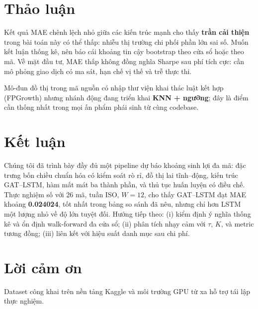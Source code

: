 \documentclass[12pt,a4paper]{article}
\begin{document}
\section{Thảo luận}

Kết quả MAE chênh lệch nhỏ giữa các kiến trúc mạnh cho thấy \textbf{trần cải thiện} trong bài toán này có thể thấp: nhiễu thị trường chi phối phần lớn sai số. Muốn kết luận thống kê, nên báo cái khoảng tin cậy bootstrap theo cửa sổ hoặc theo mã. Về mặt đầu tư, MAE thấp không đồng nghĩa Sharpe sau phí tích cực: cần mô phỏng giao dịch có ma sát, hạn chế vị thế và trễ thực thi.

Mô-đun đồ thị trong mã nguồn có nhập thư viện khai thác luật kết hợp (FPGrowth) nhưng nhánh động đang triển khai \textbf{KNN + ngưỡng}; đây là điểm cần thống nhất trong mọi ấn phẩm phái sinh từ cùng codebase.

\section{Kết luận}

Chúng tôi đã trình bày đầy đủ một pipeline dự báo khoảng sinh lợi đa mã: đặc trưng bốn chiều chuẩn hóa có kiểm soát rò rỉ, đồ thị lai tĩnh--động, kiến trúc GAT--LSTM, hàm mất mát ba thành phần, và thủ tục huấn luyện có điều chế. Thực nghiệm số với 26 mã, tuần ISO, $W=12$, cho thấy GAT--LSTM đạt MAE khoảng \textbf{0.024024}, tốt nhất trong bảng so sánh đã nêu, nhưng chỉ hơn LSTM một lượng nhỏ về độ lớn tuyệt đối. Hướng tiếp theo: (i) kiểm định ý nghĩa thống kê và ổn định walk-forward đa cửa sổ; (ii) phân tích nhạy cảm với $\tau$, $K$, và metric tương đồng; (iii) liên kết với hiệu suất danh mục sau chi phí.

\section*{Lời cảm ơn}
Dataset công khai trên nền tảng Kaggle và môi trường GPU từ xa hỗ trợ tái lập thực nghiệm.
\end{document}
